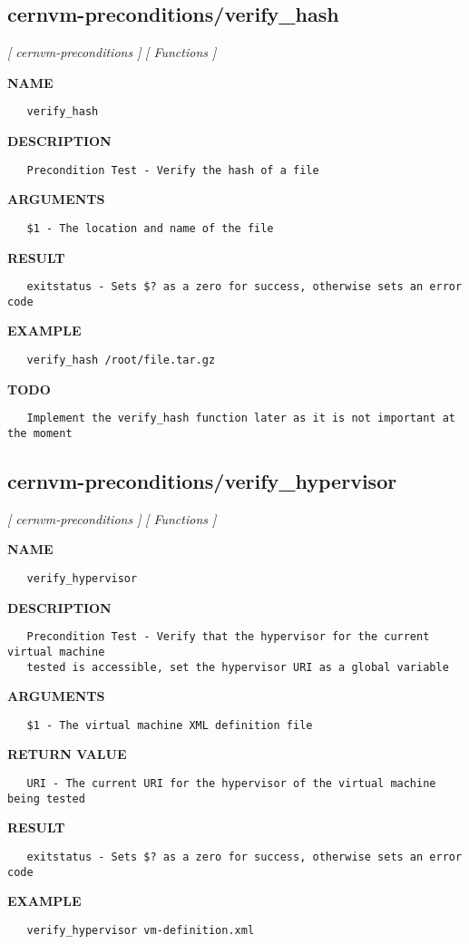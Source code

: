 \subsection{cernvm-preconditions/verify\_hash}
\textsl{[ cernvm-preconditions ]}
\textsl{[ Functions ]}

\label{ch:robo11}
\label{ch:cernvm_preconditions_verify_hash}
\textbf{NAME}
\begin{verbatim}
   verify_hash
\end{verbatim}
\textbf{DESCRIPTION}
\begin{verbatim}
   Precondition Test - Verify the hash of a file
\end{verbatim}
\textbf{ARGUMENTS}
\begin{verbatim}
   $1 - The location and name of the file
\end{verbatim}
\textbf{RESULT}
\begin{verbatim}
   exitstatus - Sets $? as a zero for success, otherwise sets an error code
\end{verbatim}
\textbf{EXAMPLE}
\begin{verbatim}
   verify_hash /root/file.tar.gz
\end{verbatim}
\textbf{TODO}
\begin{verbatim}
   Implement the verify_hash function later as it is not important at the moment
\end{verbatim}
\newpage
\subsection{cernvm-preconditions/verify\_hypervisor}
\textsl{[ cernvm-preconditions ]}
\textsl{[ Functions ]}

\label{ch:robo12}
\label{ch:cernvm_preconditions_verify_hypervisor}
\textbf{NAME}
\begin{verbatim}
   verify_hypervisor
\end{verbatim}
\textbf{DESCRIPTION}
\begin{verbatim}
   Precondition Test - Verify that the hypervisor for the current virtual machine
   tested is accessible, set the hypervisor URI as a global variable
\end{verbatim}
\textbf{ARGUMENTS}
\begin{verbatim}
   $1 - The virtual machine XML definition file
\end{verbatim}
\textbf{RETURN VALUE}
\begin{verbatim}
   URI - The current URI for the hypervisor of the virtual machine being tested
\end{verbatim}
\textbf{RESULT}
\begin{verbatim}
   exitstatus - Sets $? as a zero for success, otherwise sets an error code
\end{verbatim}
\textbf{EXAMPLE}
\begin{verbatim}
   verify_hypervisor vm-definition.xml
\end{verbatim}
\newpage

